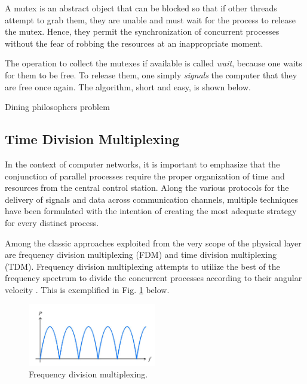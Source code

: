 \documentclass[12pt]{article}
\begin{document}
A mutex is an abstract object that can be blocked so that if other threads attempt to grab them, they are unable and must wait for the process to release the mutex. Hence, they permit the synchronization of concurrent processes without the fear of robbing the resources at an inappropriate moment.

The operation to collect the mutexes if available is called \emph{wait}, because one waits for them to be free. To release them, one simply \emph{signals} the computer that they are free once again. The algorithm, short and easy, is shown below. \vfill

\begin{algorithm}[H]
\SetAlgoLined
{}
\caption{Dining philosophers problem}
\end{algorithm}

\subsection{Time Division Multiplexing}

In the context of computer networks, it is important to emphasize that the conjunction of parallel processes require the proper organization of time and resources from the central control station. Along the various protocols for the delivery of signals and data across communication channels, multiple techniques have been formulated with the intention of creating the most adequate strategy for every distinct process.

Among the classic approaches exploited from the very scope of the physical layer are frequency division multiplexing (FDM) and time division multiplexing (TDM). Frequency division multiplexing attempts to utilize the best of the frequency spectrum to divide the concurrent processes according to their angular velocity \cite{compnet}. This is exemplified in Fig. \ref{fig:freq} below.

\begin{figure}[ht]
\includegraphics[width=0.5\textwidth]{freq}
\centering
\caption{Frequency division multiplexing.}
\label{fig:freq}
\end{figure}
\end{document}
